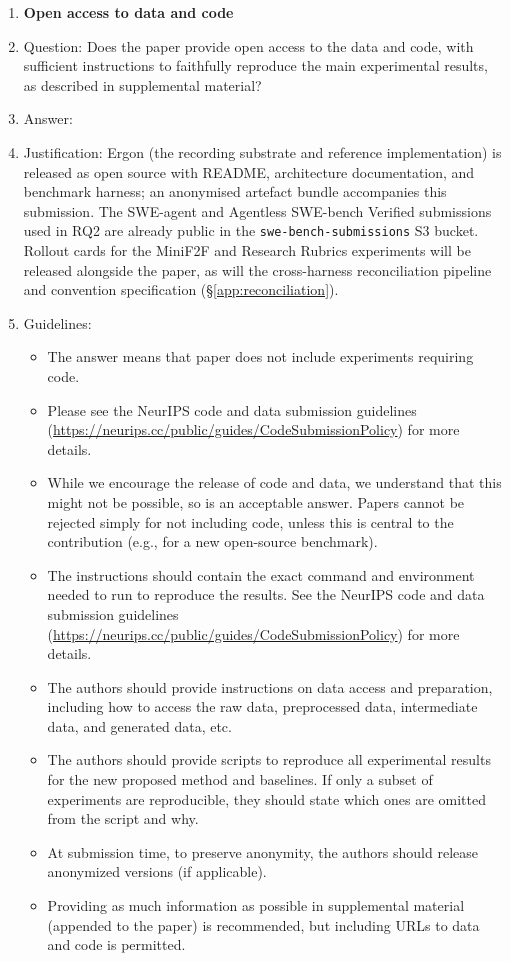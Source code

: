 \begin{enumerate}
\item {\bf Open access to data and code}
    \item[] Question: Does the paper provide open access to the data and code, with sufficient instructions to faithfully reproduce the main experimental results, as described in supplemental material?
    \item[] Answer: \answerYes{}
    \item[] Justification: Ergon (the recording substrate and reference implementation) is released as open source with README, architecture documentation, and benchmark harness; an anonymised artefact bundle accompanies this submission. The SWE-agent and Agentless SWE-bench Verified submissions used in RQ2 are already public in the \texttt{swe-bench-submissions} S3 bucket. Rollout cards for the MiniF2F and Research Rubrics experiments will be released alongside the paper, as will the cross-harness reconciliation pipeline and convention specification (\S\ref{app:reconciliation}).
    \item[] Guidelines:
    \begin{itemize}
        \item The answer \answerNA{} means that paper does not include experiments requiring code.
        \item Please see the NeurIPS code and data submission guidelines (\url{https://neurips.cc/public/guides/CodeSubmissionPolicy}) for more details.
        \item While we encourage the release of code and data, we understand that this might not be possible, so \answerNo{} is an acceptable answer. Papers cannot be rejected simply for not including code, unless this is central to the contribution (e.g., for a new open-source benchmark).
        \item The instructions should contain the exact command and environment needed to run to reproduce the results. See the NeurIPS code and data submission guidelines (\url{https://neurips.cc/public/guides/CodeSubmissionPolicy}) for more details.
        \item The authors should provide instructions on data access and preparation, including how to access the raw data, preprocessed data, intermediate data, and generated data, etc.
        \item The authors should provide scripts to reproduce all experimental results for the new proposed method and baselines. If only a subset of experiments are reproducible, they should state which ones are omitted from the script and why.
        \item At submission time, to preserve anonymity, the authors should release anonymized versions (if applicable).
        \item Providing as much information as possible in supplemental material (appended to the paper) is recommended, but including URLs to data and code is permitted.
    \end{itemize}



\end{enumerate}
